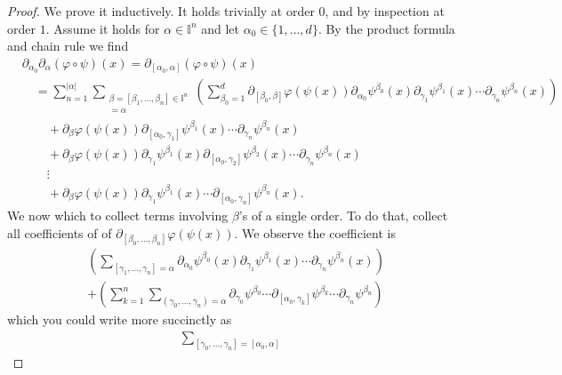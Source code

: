 \documentclass[12pt]{amsart}
\begin{document}
\begin{proof}
  We prove it inductively.  It holds trivially at order $0$,
  and by inspection at order $1$.
  Assume it holds for $\alpha \in \mathbb{I}^n$
  and let $\alpha_0 \in \{ 1,\dots,d\}$.
  By the product formula and chain rule we find
  \begin{align*}
    &\partial_{\alpha_0}\partial_\alpha( \varphi \circ \psi)(x) = 
    \partial_{[\alpha_0,\alpha]}( \varphi \circ \psi)(x) \\
    &\quad =\sum_{n=1}^{|\alpha|}
    \sum_{ 
      \substack{
        \beta = [\beta_1,\dots,\beta_n] \in \mathbb{I}^n \\
        [\gamma_1,\dots,\gamma_n] = \alpha 
        }
      }
      \left( \sum_{\beta_0=1}^d
        \partial_{[\beta_0,\beta]} \varphi(\psi(x))
        \partial_{\alpha_0} \psi^{\beta_0}(x)
        \partial_{\gamma_1} \psi^{\beta_1}(x) \cdots
        \partial_{\gamma_n} \psi^{\beta_n}(x)
      \right)\\
      &\qquad + \partial_{\beta} \varphi(\psi(x))
      \partial_{[\alpha_0,\gamma_1]} \psi^{\beta_1}(x) \cdots
      \partial_{\gamma_n} \psi^{\beta_n}(x) \\
      &\qquad + \partial_{\beta} \varphi(\psi(x))
      \partial_{\gamma_1} \psi^{\beta_1}(x) 
      \partial_{[\alpha_0,\gamma_2]} \psi^{\beta_2}(x)  \cdots
      \partial_{\gamma_n} \psi^{\beta_n}(x) \\
      &\qquad \vdots \\
      &\qquad + \partial_{\beta} \varphi(\psi(x))
      \partial_{\gamma_1} \psi^{\beta_1}(x) \cdots
      \partial_{[\alpha_0,\gamma_n]} \psi^{\beta_n}(x) . 
  \end{align*}
We now which to collect terms involving $\beta$'s of a single order.
To do that, collect all coefficients of of $\partial_{[\beta_0,\dots,\beta_n]} \varphi(\psi(x))$.
We observe the coefficient is
\begin{align*}
&   \left( \sum_{ [\gamma_1,\dots,\gamma_n] = \alpha}
   \partial_{\alpha_0}\psi^{\beta_0}(x) \partial_{\gamma_1} \psi^{\beta_1}(x) \cdots \partial_{\gamma_n}\psi^{\beta_n}(x) \right) \\
& +
 \left( \sum_{k=1}^{n} \sum_{ (\gamma_0, \dots,\gamma_n) = \alpha}
  \partial_{\gamma_0}\psi^{\beta_0} \cdots \partial_{[\alpha_0,\gamma_k]} \psi^{\beta_k} \cdots \partial_{\gamma_n} \psi^{\beta_n}\right)
\end{align*}
which you could write more succinctly as
\begin{align*}
  \sum_{[\gamma_0,\dots,\gamma_n] = [\alpha_0,\alpha]}

\end{align*}
\end{proof}
\end{document}
